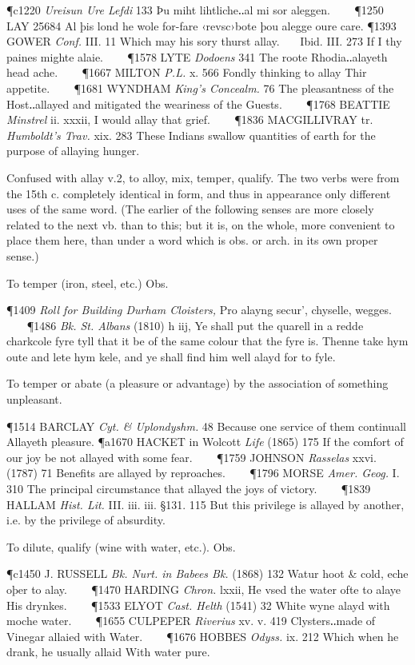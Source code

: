 \begin{description}[wide, labelwidth=!, labelindent=0pt]
\begin{myenumerate}
\P c1220 \textit{Ureisun Ure Lefdi} 133 Þu miht lihtliche‥al mi sor aleggen.    
\P 1250 LAY 25684 Al þis lond he wole for-fare ‹revsc›bote þou alegge oure care.
\P 1393 GOWER \textit{Conf.} III. 11 Which may his sory thurst allay.    Ibid. III. 273 If I thy paines mighte alaie.    
\P 1578 LYTE \textit{Dodoens} 341 The roote Rhodia‥alayeth head ache.    
\P 1667 MILTON \textit{P.L.} x. 566 Fondly thinking to allay Thir appetite.    
\P 1681 WYNDHAM \textit{King's Concealm.} 76 The pleasantness of the Host‥allayed and mitigated the weariness of the Guests.    
\P 1768 BEATTIE \textit{Minstrel} ii. xxxii, I would allay that grief.    
\P 1836 MACGILLIVRAY tr. \textit{Humboldt's Trav.} xix. 283 These Indians swallow quantities of earth for the purpose of allaying hunger.

 Confused with allay v.2, to alloy, mix, temper, qualify. The two verbs were from the 15th c. completely identical in form, and thus in appearance only different uses of the same word. (The earlier of the following senses are more closely related to the next vb. than to this; but it is, on the whole, more convenient to place them here, than under a word which is obs. or arch. in its own proper sense.) 

 To temper (iron, steel, etc.) Obs. 

\P 1409 \textit{Roll for Building Durham Cloisters,} Pro alayng secur', chyselle, wegges.    
\P 1486 \textit{Bk. St. Albans} (1810) h iij, Ye shall put the quarell in a redde charkcole fyre tyll that it be of the same colour that the fyre is. Thenne take hym oute and lete hym kele, and ye shall find him well alayd for to fyle.

 To temper or abate (a pleasure or advantage) by the association of something unpleasant. 

\P 1514 BARCLAY \textit{Cyt. \& Uplondyshm.} 48 Because one service of them continuall Allayeth pleasure.
\P a1670 HACKET in Wolcott \textit{Life} (1865) 175 If the comfort of our joy be not allayed with some fear.    
\P 1759 JOHNSON \textit{Rasselas} xxvi. (1787) 71 Benefits are allayed by reproaches.    
\P 1796 MORSE \textit{Amer. Geog.} I. 310 The principal circumstance that allayed the joys of victory.    
\P 1839 HALLAM \textit{Hist. Lit.} III. iii. iii. §131. 115 But this privilege is allayed by another, i.e. by the privilege of absurdity.

 To dilute, qualify (wine with water, etc.). Obs. 

\P c1450 J. RUSSELL \textit{Bk. Nurt. in Babees Bk.} (1868) 132 Watur hoot \& cold, eche oþer to alay.    
\P 1470 HARDING \textit{Chron.} lxxii, He vsed the water ofte to alaye His drynkes.    
\P 1533 ELYOT \textit{Cast. Helth} (1541) 32 White wyne alayd with moche water.    
\P 1655 CULPEPER \textit{Riverius} xv. v. 419 Clysters‥made of Vinegar allaied with Water.    
\P 1676 HOBBES \textit{Odyss.} ix. 212 Which when he drank, he usually allaid With water pure.


\end{myenumerate}
\end{description}
